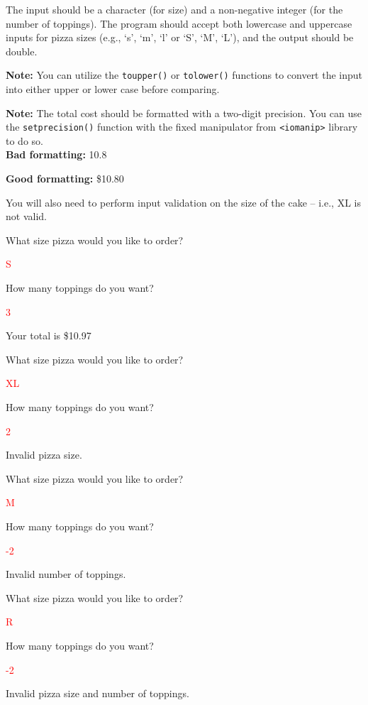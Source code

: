 The input should be a character (for size) and a non-negative integer (for the number of toppings). The program should accept both lowercase and uppercase inputs for pizza sizes (e.g., `s', `m', `l' or `S', `M', `L'), and the output should be double.

\textbf{Note:} You can utilize the \texttt{toupper()} or \texttt{tolower()} functions to convert the input into either upper or lower case before comparing. 

\textbf{Note:} The total cost should be formatted with a two-digit precision. You can use the \texttt{setprecision()} function with the fixed manipulator from \texttt{<iomanip>} library to do so.\\

\textbf{Bad formatting:} 10.8

\textbf{Good formatting:} \$10.80

You will also need to perform input validation on the size of the cake -- i.e., XL is not valid. 

\begin{sample}
What size pizza would you like to order?

\textcolor{red}{S}

How many toppings do you want?

\textcolor{red}{3}

Your total is \$10.97
\end{sample}

\begin{sample}
What size pizza would you like to order?

\textcolor{red}{XL}

How many toppings do you want?

\textcolor{red}{2}

Invalid pizza size.
\end{sample}

\begin{sample}
What size pizza would you like to order?

\textcolor{red}{M}

How many toppings do you want?

\textcolor{red}{-2}

Invalid number of toppings.
\end{sample}

\begin{sample}
What size pizza would you like to order?

\textcolor{red}{R}

How many toppings do you want?

\textcolor{red}{-2}

Invalid pizza size and number of toppings.
\end{sample}

